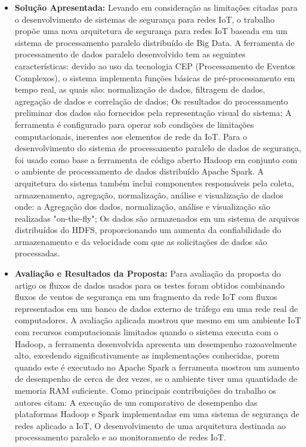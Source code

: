 \documentclass[tid,table]{texufpel} %
\begin{document}
\begin{itemize}
	\item \textbf{Solução Apresentada:} Levando em consideração as limitações citadas para o desenvolvimento de sistemas de segurança para redes IoT, o trabalho propõe uma nova arquitetura de segurança para redes IoT baseada em um sistema de processamento paralelo distribuído de Big Data. A ferramenta de processamento de dados paralelo desenvolvido tem as seguintes características: devido ao uso da tecnologia CEP (Processamento de Eventos Complexos), o sistema implementa funções básicas de pré-processamento em tempo real, as quais são: normalização de dados, filtragem de dados, agregação de dados e correlação de dados; Os resultados do processamento preliminar dos dados são fornecidos pela representação visual do sistema; A ferramenta é configurado para operar sob condições de limitações computacionais, inerentes aos elementos de rede da IoT. Para o desenvolvimento do sistema de processamento paralelo de dados de segurança, foi usado como base a ferramenta de código aberto Hadoop em conjunto com o ambiente de processamento de dados distribuído Apache Spark. A arquitetura do sistema também inclui componentes responsáveis pela coleta, armazenamento, agregação, normalização, análise e visualização de dados onde: a Agregação dos dados, normalização, análise e visualização são realizadas "on-the-fly"; Os dados são armazenados em um sistema de arquivos distribuídos do HDFS, proporcionando um aumenta da confiabilidade do armazenamento e da velocidade com que as solicitações de dados são processadas.
	

	\item \textbf{Avaliação e Resultados da Proposta:} Para avaliação da proposta do artigo os fluxos de dados usados para os testes foram obtidos combinando fluxos de ventos de segurança em um fragmento da rede IoT com fluxos representados em um banco de dados externo de tráfego em uma rede real de computadores. A avaliação aplicada mostrou que mesmo em um ambiente IoT com recursos computacionais limitados quando o sistema executa com o Hadoop, a ferramenta desenvolvida apresenta um desempenho razoavelmente alto, excedendo significativamente as implementações conhecidas, porem quando este é executado no Apache Spark a ferramenta mostrou um aumento de desempenho de cerca de dez vezes, se o ambiente tiver uma quantidade de memoria RAM suficiente. Como principais contribuições do trabalho os autores citam: A execução de um comparativo de desempenho das plataformas Hadoop e Spark implementadas em uma sistema de segurança de redes aplicado a IoT, O desenvolvimento de uma arquitetura destinada ao processamento paralelo e ao monitoramento de redes IoT. 
	
	
	
	
\end{itemize}
\end{document}
